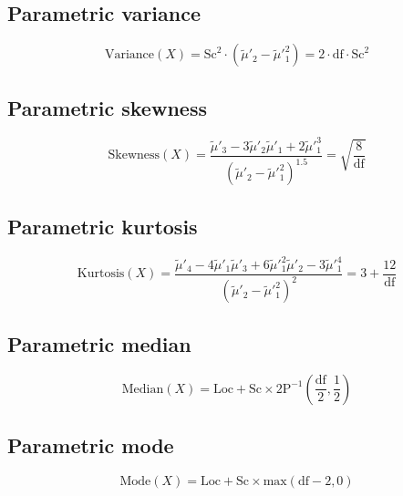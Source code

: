 \documentclass{article}
\begin{document}
\subsection{Parametric variance}
\begin{equation*} \mathrm{Variance}(X)=\text{Sc}^{2}\cdot(\tilde{\mu}'_{2}-\tilde{\mu}'^{2}_{1})=2\cdot \text{df}\cdot \text{Sc}^{2} \end{equation*}
\subsection{Parametric skewness}
\begin{equation*} \mathrm{Skewness}(X)=\frac{\tilde{\mu}'_{3}-3\tilde{\mu}'_{2}\tilde{\mu}'_{1}+2\tilde{\mu}'^{3}_{1}}{(\tilde{\mu}'_{2}-\tilde{\mu}'^{2}_{1})^{1.5}}=\sqrt{\frac{8}{\text{df}}} \end{equation*}
\subsection{Parametric kurtosis}
\begin{equation*} \mathrm{Kurtosis}(X)=\frac{\tilde{\mu}'_{4}-4\tilde{\mu}'_{1}\tilde{\mu}'_{3}+6\tilde{\mu}'^{2}_{1}\tilde{\mu}'_{2}-3\tilde{\mu}'^{4}_{1}}{(\tilde{\mu}'_{2}-\tilde{\mu}'^{2}_{1})^{2}}=3+\frac{12}{\text{df}} \end{equation*}
\subsection{Parametric median}
\begin{equation*} \mathrm{Median}(X)=\text{Loc}+\text{Sc}\times 2\text{P}^{-1}\left(\frac{\text{df}}{2},\frac{1}{2}\right) \end{equation*}
\subsection{Parametric mode}
\begin{equation*} \mathrm{Mode}(X)=\text{Loc}+\text{Sc}\times \text{max}(\text{df}-2,0) \end{equation*}
\end{document}
